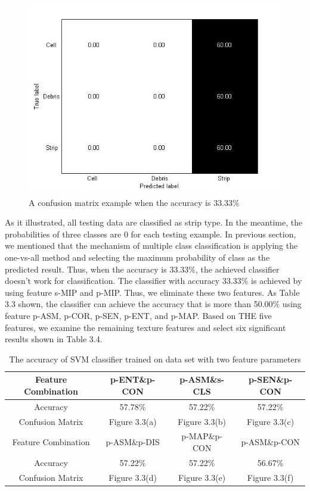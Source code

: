 \begin{figure}[!h]
\includegraphics[width=\linewidth]{confusion_matrix/fig3_2}
\caption{A confusion matrix example when the accuracy is 33.33\%}
\end{figure}
As it illustrated, all testing data are classified as strip type. In the meantime, the probabilities of three classes are 0 for each testing example. In previous section, we mentioned that the mechanism of multiple class classification is applying the one-vs-all method and selecting the maximum probability of class as the predicted result. Thus, when the accuracy is 33.33\%, the achieved classifier doesn't work for classification. The classifier with accuracy 33.33\% is achieved by using feature s-MIP and p-MIP. Thus, we eliminate these two features. As Table 3.3 shown, the classifier can achieve the accuracy that is more than 50.00\% using feature p-ASM, p-COR, p-SEN, p-ENT, and p-MAP. Based on THE five features, we examine the remaining texture features and select six significant results shown in Table 3.4.   
\begin{table}[!h]
\begin{center}
\renewcommand{\arraystretch}{0.5}
\begin{tabular}{|| c | c c c ||}
\hline
 Feature Combination& p-ENT\&p-CON & p-ASM\&s-CLS & p-SEN\&p-CON \\
 \hline
 Accuracy & 57.78\% & 57.22\% & 57.22\% \\
 \hline
 Confusion Matrix & Figure 3.3(a) & Figure 3.3(b) & Figure 3.3(c) \\
 \hline
 \hline
 Feature Combination& p-ASM\&p-DIS & p-MAP\&p-CON & p-ASM\&p-CON \\
 \hline
 Accuracy & 57.22\% & 57.22\% & 56.67\% \\
 \hline
 Confusion Matrix & Figure 3.3(d) & Figure 3.3(e) & Figure 3.3(f) \\
 \hline
\end{tabular}
\end{center}
\caption{The accuracy of SVM classifier trained on data set with two feature parameters}
\end{table}
